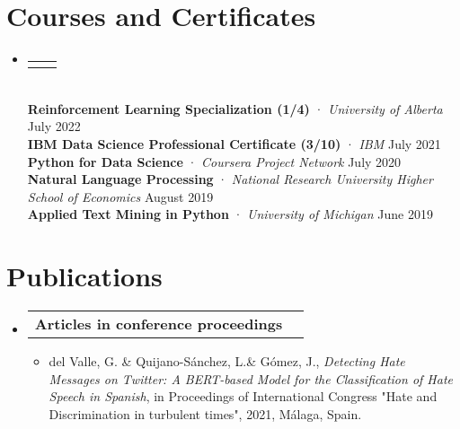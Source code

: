 \documentclass[letterpaper,11pt]{article}
\makeatletter
\newcommand{\resumeItem}[1]{
  \item\small{
    {#1 \vspace{-2pt}}
  }
}
\newcommand{\resumeProjectHeading}[2]{
    \item
    \begin{tabular*}{0.97\textwidth}{l@{\extracolsep{\fill}}r}
      \small#1 & #2 \\
    \end{tabular*}\vspace{-7pt}
}
\newcommand{\resumeSubHeadingListStart}{\begin{itemize}[leftmargin=0.15in, label={}]}
\newcommand{\resumeSubHeadingListEnd}{\end{itemize}}
\newcommand{\resumeItemListStart}{\begin{itemize}}
\newcommand{\resumeItemListEnd}{\end{itemize}\vspace{-5pt}}
\makeatother
\begin{document}
\section{Courses and Certificates}
    \resumeSubHeadingListStart
      \resumeProjectHeading
          {}{}\\
          \vspace{-0.4em}
          {\textbf{Reinforcement Learning Specialization (1/4)} · \emph{University of Alberta}}{ \hspace{10.6em} July 2022}\\
          \vspace{0.3em}
          {\textbf{IBM Data Science Professional Certificate (3/10)} · \emph{IBM}}{ \hspace{15.3em} July 2021}\\
          \vspace{0.3em}
          {\textbf{Python for Data Science} · \emph{Coursera Project Network}}{ \hspace{18.5em} July 2020}\\
          \vspace{0.3em}
          {\textbf{Natural Language Processing} · \emph{National Research University Higher School of Economics }}{ \hspace{0.5em} August 2019} \\
          \vspace{0.3em}
          {\textbf{Applied Text Mining in Python} · \emph{University of Michigan}}{ \hspace{16em} June 2019}\\
  
          
          
    \resumeSubHeadingListEnd

\section{Publications}
    \resumeSubHeadingListStart
      \resumeProjectHeading
          {\textbf{Articles in conference proceedings}}{ }
          
          \resumeItemListStart
          \resumeItem{del Valle, G. \& Quijano-Sánchez, L.\& Gómez, J., \emph{Detecting Hate Messages on Twitter: A BERT-based Model for the Classification of Hate Speech in Spanish}, in Proceedings of International Congress "Hate and Discrimination in turbulent times", 2021, Málaga, Spain.}
          \resumeItemListEnd
    \resumeSubHeadingListEnd
\end{document}
